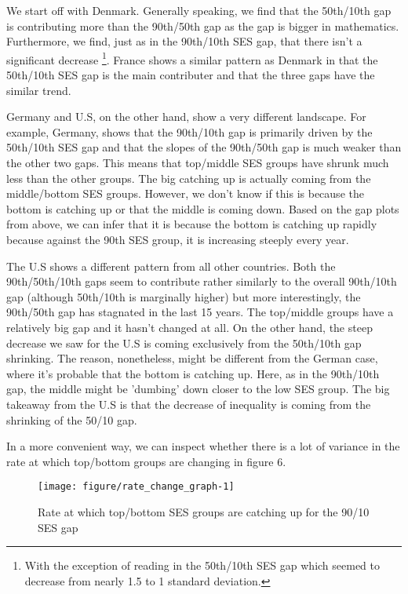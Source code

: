 \documentclass[11pt, a4paper]{article}\usepackage[]{graphicx}\usepackage[]{color}
\begin{document}

We start off with Denmark. Generally speaking, we find that the 50th/10th gap is contributing more than the 90th/50th gap as the gap is bigger in mathematics. Furthermore, we find, just as in the 90th/10th SES gap, that there isn't a significant decrease \footnote{With the exception of reading in the 50th/10th SES gap which seemed to decrease from nearly 1.5 to 1 standard deviation.}. France shows a similar pattern as Denmark in that the 50th/10th SES gap is the main contributer and that the three gaps have the similar trend. 

Germany and U.S, on the other hand, show a very different landscape. For example, Germany, shows that the 90th/10th gap is primarily driven by the 50th/10th SES gap and that the slopes of the 90th/50th gap is much weaker than the other two gaps. This means that top/middle SES groups have shrunk much less than the other groups. The big catching up is actually coming from the middle/bottom SES groups. However, we don't know if this is because the bottom is catching up or that the middle is coming down. Based on the gap plots from above, we can infer that it is because the bottom is catching up rapidly because against the 90th SES group, it is increasing steeply every year.

The U.S shows a different pattern from all other countries. Both the 90th/50th/10th gaps seem to contribute rather similarly to the overall 90th/10th gap (although 50th/10th is marginally higher) but more interestingly, the 90th/50th gap has stagnated in the last 15 years. The top/middle groups have a relatively big gap and it hasn't changed at all. On the other hand, the steep decrease we saw for the U.S is coming exclusively from the 50th/10th gap shrinking. The reason, nonetheless, might be different from the German case, where it's probable that the bottom is catching up. Here, as in the 90th/10th gap, the middle might be 'dumbing' down closer to the low SES group. The big takeaway from the U.S is that the decrease of inequality is coming from the shrinking of the 50/10 gap.

In a more convenient way, we can inspect whether there is a lot of variance in the rate at which top/bottom groups are changing in figure 6.



\begin{figure}

{\centering \texttt{[image: figure/rate\_change\_graph-1]} 

}

\caption[Rate at which top/bottom SES groups are catching up for the 90/10 SES gap]{Rate at which top/bottom SES groups are catching up for the 90/10 SES gap}\label{fig:rate_change_graph}
\end{figure}
\end{document}
